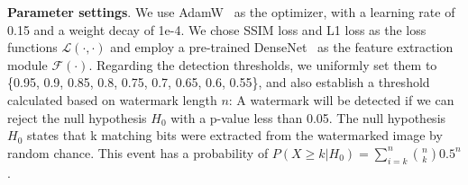 \textbf{Parameter settings}. We use AdamW~\cite{loshchilov2017decoupled} as the optimizer, with a learning rate of 0.15 and a weight decay of 1e-4. We chose SSIM loss and L1 loss as the loss functions $\mathcal{L}(\cdot,\cdot)$ and employ a pre-trained DenseNet~\cite{DenseNet2017} as the feature extraction module $\mathcal{F}(\cdot)$. Regarding the detection thresholds, we uniformly set them to \{0.95, 0.9, 0.85, 0.8, 0.75, 0.7, 0.65, 0.6, 0.55\}, and also establish a threshold calculated based on watermark length $n$: A watermark will be detected if we can reject the null hypothesis $H_0$ with a p-value less than 0.05. The null hypothesis $H_0$ states that k matching bits were extracted from the watermarked image by random chance. This event has a probability of $P(X\ge k|H_0) = \sum_{i=k}^n{n\choose k}0.5^n$.



